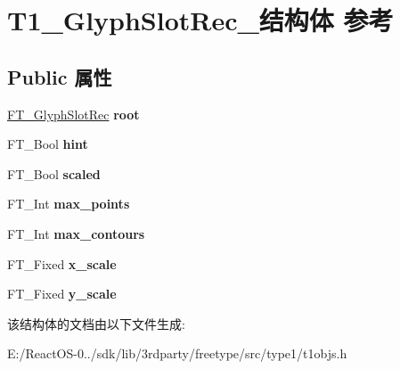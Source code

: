 \hypertarget{struct_t1___glyph_slot_rec__}{}\section{T1\+\_\+\+Glyph\+Slot\+Rec\+\_\+结构体 参考}
\label{struct_t1___glyph_slot_rec__}
\subsection*{Public 属性}
\begin{DoxyCompactItemize}
\item 
\mbox{\label{struct_t1___glyph_slot_rec___a84db71b78eef89959790a346f1ada9f1}} 
\hyperlink{struct_f_t___glyph_slot_rec__}{F\+T\+\_\+\+Glyph\+Slot\+Rec} {\bfseries root}
\item 
\mbox{\label{struct_t1___glyph_slot_rec___ab4777ab7bd1140891750de33f3ef3d7e}} 
F\+T\+\_\+\+Bool {\bfseries hint}
\item 
\mbox{\label{struct_t1___glyph_slot_rec___a6a253116dcea54d63d69ee2701a2014d}} 
F\+T\+\_\+\+Bool {\bfseries scaled}
\item 
\mbox{\label{struct_t1___glyph_slot_rec___acbe78d73b1aeac251467c0bfbbb087db}} 
F\+T\+\_\+\+Int {\bfseries max\+\_\+points}
\item 
\mbox{\label{struct_t1___glyph_slot_rec___ad8c8b84acdb97f293c7fda875b428589}} 
F\+T\+\_\+\+Int {\bfseries max\+\_\+contours}
\item 
\mbox{\label{struct_t1___glyph_slot_rec___af1b4c8fa0acced4743d667779db082a7}} 
F\+T\+\_\+\+Fixed {\bfseries x\+\_\+scale}
\item 
\mbox{\label{struct_t1___glyph_slot_rec___aff4e17984b008b51d4109fe980b0ea6a}} 
F\+T\+\_\+\+Fixed {\bfseries y\+\_\+scale}
\end{DoxyCompactItemize}


该结构体的文档由以下文件生成\+:\begin{DoxyCompactItemize}
\item 
E\+:/\+React\+O\+S-\/0../sdk/lib/3rdparty/freetype/src/type1/t1objs.\+h\end{DoxyCompactItemize}
